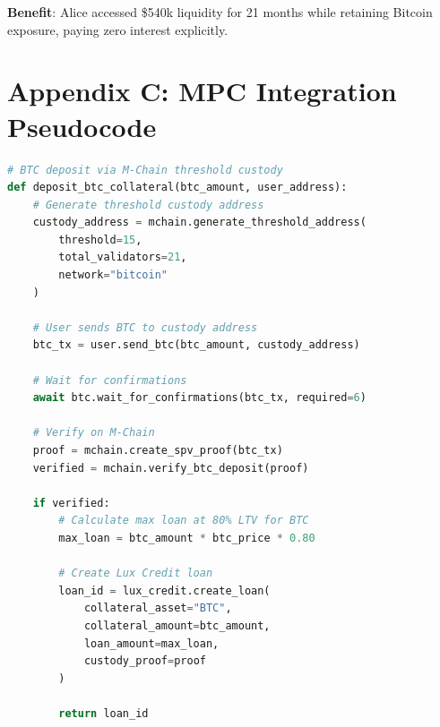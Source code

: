 \documentclass[11pt,a4paper]{article}
\begin{document}
\textbf{Benefit}: Alice accessed \$540k liquidity for 21 months while retaining Bitcoin exposure, paying zero interest explicitly.

\section{Appendix C: MPC Integration Pseudocode}

\begin{lstlisting}[language=Python, basicstyle=\footnotesize\ttfamily]
# BTC deposit via M-Chain threshold custody
def deposit_btc_collateral(btc_amount, user_address):
    # Generate threshold custody address
    custody_address = mchain.generate_threshold_address(
        threshold=15,
        total_validators=21,
        network="bitcoin"
    )
    
    # User sends BTC to custody address
    btc_tx = user.send_btc(btc_amount, custody_address)
    
    # Wait for confirmations
    await btc.wait_for_confirmations(btc_tx, required=6)
    
    # Verify on M-Chain
    proof = mchain.create_spv_proof(btc_tx)
    verified = mchain.verify_btc_deposit(proof)
    
    if verified:
        # Calculate max loan at 80% LTV for BTC
        max_loan = btc_amount * btc_price * 0.80
        
        # Create Lux Credit loan
        loan_id = lux_credit.create_loan(
            collateral_asset="BTC",
            collateral_amount=btc_amount,
            loan_amount=max_loan,
            custody_proof=proof
        )
        
        return loan_id
\end{lstlisting}
\end{document}
